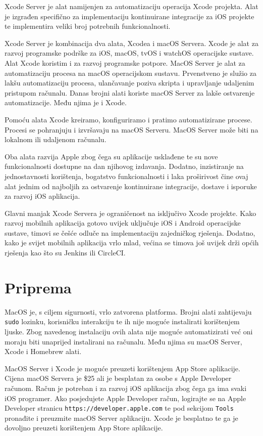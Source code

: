 \documentclass[times, utf8, diplomski, numeric]{fer}
\begin{document}
\begin{appendices}
Xcode Server je alat namijenjen za automatizaciju operacija Xcode projekta. Alat je izgrađen specifično za implementaciju kontinuirane integracije za iOS projekte te implementira veliki broj potrebnih funkcionalnosti.

Xcode Server je kombinacija dva alata, Xcodea i macOS Servera. Xcode je alat za razvoj programske podrške za iOS, macOS, tvOS i watchOS operacijske sustave. Alat Xcode koristim i za razvoj programske potpore. MacOS Server je alat za automatizaciju procesa na macOS operacijskom sustavu. Prvenstveno je služio za lakšu automatizaciju procesa, ulančavanje poziva skripta i upravljanje udaljenim pristupom računalu. Danas brojni alati koriste macOS Server za lakše ostvarenje automatizacije. Među njima je i Xcode.

Pomoću alata Xcode kreiramo, konfiguriramo i pratimo automatizirane procese. Procesi se pohranjuju i izvršavaju na macOS Serveru. MacOS Server može biti na lokalnom ili udaljenom računalu.

Oba alata razvija Apple zbog čega su aplikacije usklađene te su nove funkcionalnosti dostupne na dan njihovog izdavanja. Dodatno, inzistiranje na jednostavnosti korištenja, bogatstvo funkcionalnosti i laka proširivost čine ovaj alat jednim od najboljih za ostvarenje kontinuirane integracije, dostave i isporuke za razvoj iOS aplikacija.

Glavni manjak Xcode Servera je ograničenost na isključivo Xcode projekte. Kako razvoj mobilnih aplikacija gotovo uvijek uključuje iOS i Android operacijske sustave, timovi se češće odluče na implementaciju zajedničkog rješenja. Dodatno, kako je svijet mobilnih aplikacija vrlo mlad, većina se timova još uvijek drži općih rješenja kao što su Jenkins ili CircleCI.

\section{Priprema}

MacOS je, s ciljem sigurnosti, vrlo zatvorena platforma. Brojni alati zahtijevaju \verb|sudo| lozinku, korisničku interakciju te ih nije moguće instalirati korištenjem ljuske. Zbog navedenog instalaciju ovih alata nije moguće automatizirati već oni moraju biti unaprijed instalirani na računalu. Među njima su macOS Server, Xcode i Homebrew alati.

MacOS Server i Xcode je moguće preuzeti korištenjem App Store aplikacije. Cijena macOS Servera je \$25 ali je besplatan za osobe s Apple Developer računom. Račun je potreban i za razvoj iOS aplikacija zbog čega ga ima svaki iOS programer. Ako posjedujete Apple Developer račun, logirajte se na Apple Developer stranicu \verb|https://developer.apple.com| te pod sekcijom \verb|Tools| pronađite i preuzmite macOS Server aplikaciju. Xcode je besplatno te ga je dovoljno preuzeti korištenjem App Store aplikacije.


\end{appendices}
\end{document}
